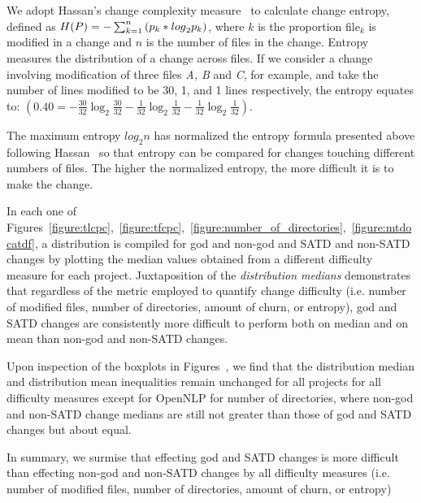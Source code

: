 We adopt Hassan's change complexity measure~\cite{hassan2009predicting} to calculate change entropy, defined as $H(P)=-\sum _{k=1}^{n}\textrm ({p}_{k}*{log}_{2} {p}_{k})$, where $k$ is the proportion file$_{k}$ is modified in a change and $n$ is the number of files in the change. Entropy measures the distribution of a change across files. If we consider a change involving modification of three files \textit{A, B} and \textit{C}, for example, and take the number of lines modified to be 30, 1, and 1 lines respectively, the entropy equates to: $(0.40=-\frac{30}{32}\log_{2}\frac{30}{32}-\frac{1}{32}\log_{2}\frac{1}{32}-\frac{1}{32}\log_{2}\frac{1}{32})$.

The maximum entropy $log_{2}n$ has normalized the entropy formula presented above following Hassan~\cite{hassan2009predicting} so that entropy can be compared for changes touching different numbers of files. The higher the normalized entropy, the more difficult it is to make the change.\\



In each one of Figures~\ref{figure:tlcpc},~\ref{figure:tfcpc},~\ref{figure:number_of_directories},~\ref{figure:mtdocatdf}, a distribution is compiled for god and non-god and SATD and non-SATD changes by plotting the median values obtained from a different difficulty measure for each project. Juxtaposition of the \textit{distribution medians} demonstrates that regardless of the metric employed to quantify change difficulty (i.e. number of modified files, number of directories, amount of churn, or entropy), god and SATD changes are consistently more difficult to perform both on median and on mean than non-god and non-SATD changes.

Upon inspection of the boxplots in Figures~, we find that the distribution median and distribution mean inequalities remain unchanged for all projects for all difficulty measures except for OpenNLP for number of directories, where non-god and non-SATD change medians are still not greater than those of god and SATD changes but about equal.

In summary, we surmise that effecting god and SATD changes is more difficult than effecting non-god and non-SATD changes by all difficulty measures (i.e. number of modified files, number of directories, amount of churn, or entropy)




\subsection*{\chapterIVrqIV}

